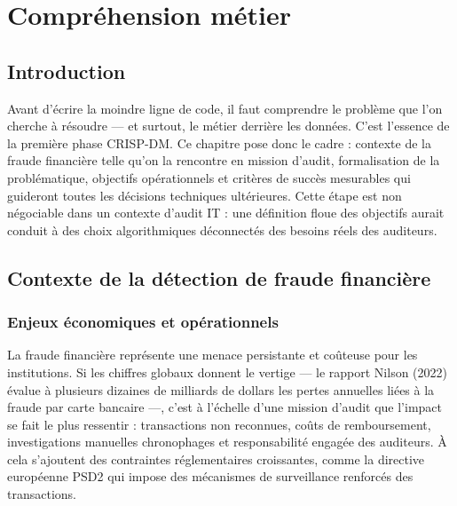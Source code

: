 \chapter{Compréhension métier}

\section*{Introduction}

Avant d'écrire la moindre ligne de code, il faut comprendre le problème que l'on cherche
à résoudre --- et surtout, le métier derrière les données. C'est l'essence de la première
phase CRISP-DM. Ce chapitre pose donc le cadre : contexte de la fraude financière telle
qu'on la rencontre en mission d'audit, formalisation de la problématique, objectifs
opérationnels et critères de succès mesurables qui guideront toutes les décisions techniques
ultérieures. Cette étape est non négociable dans un contexte d'audit IT : une définition
floue des objectifs aurait conduit à des choix algorithmiques déconnectés des besoins réels
des auditeurs.

\section{Contexte de la détection de fraude financière}

\subsection{Enjeux économiques et opérationnels}

La fraude financière représente une menace persistante et coûteuse pour les institutions.
Si les chiffres globaux donnent le vertige --- le rapport Nilson (2022) évalue à plusieurs
dizaines de milliards de dollars les pertes annuelles liées à la fraude par carte bancaire
---, c'est à l'échelle d'une mission d'audit que l'impact se fait le plus ressentir :
transactions non reconnues, coûts de remboursement, investigations manuelles chronophages
et responsabilité engagée des auditeurs. À cela s'ajoutent des contraintes réglementaires
croissantes, comme la directive européenne PSD2 qui impose des mécanismes de surveillance
renforcés des transactions.

